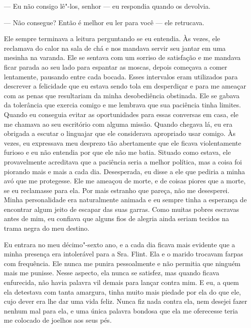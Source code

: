 --- Eu não consigo lê"-los, senhor --- eu respondia quando os devolvia.

--- Não consegue? Então é melhor eu ler para você --- ele retrucava.

Ele sempre terminava a leitura perguntando se eu entendia. Às vezes, ele
reclamava do calor na sala de chá e nos mandava servir seu jantar em uma
mesinha na varanda. Ele se sentava com um sorriso de satisfação e me
mandava ficar parada ao seu lado para espantar as moscas, depois
começava a comer lentamente, pausando entre cada bocada. Esses
intervalos eram utilizados para descrever a felicidade que eu estava
sendo tola em desperdiçar e para me ameaçar com as penas que resultariam
da minha desobediência obstinada. Ele se gabava da tolerância que
exercia comigo e me lembrava que sua paciência tinha limites. Quando eu
conseguia evitar as oportunidades para essas conversas em casa, ele me
chamava ao seu escritório com alguma missão. Quando chegava lá, eu era
obrigada a escutar o linguajar que ele considerava apropriado usar
comigo. Às vezes, eu expressava meu desprezo tão abertamente que ele
ficava violentamente furioso e eu não entendia por que ele não me batia.
Situado como estava, ele provavelmente acreditava que a paciência seria
a melhor política, mas a coisa foi piorando mais e mais a cada dia.
Desesperada, eu disse a ele que pediria a minha avó que me protegesse.
Ele me ameaçou de morte, e de coisas piores que a morte, se eu
reclamasse para ela. Por mais estranho que pareça, não me desesperei.
Minha personalidade era naturalmente animada e eu sempre tinha a
esperança de encontrar algum jeito de escapar das suas garras. Como
muitas pobres escravas antes de mim, eu confiava que alguns fios de
alegria ainda seriam tecidos na trama negra do meu destino.

Eu entrara no meu décimo"-sexto ano, e a
cada dia ficava mais evidente que a minha presença era intolerável para
a Sra. Flint. Ela e o marido trocavam farpas com frequência. Ele nunca
me punira pessoalmente e não permitia que ninguém mais me punisse. Nesse
aspecto, ela nunca se satisfez, mas quando ficava enfurecida, não havia
palavra vil demais para lançar contra mim. E eu, a quem ela detestava
com tanta amargura, tinha muito mais piedade por ela do que ele, cujo
dever era lhe dar uma vida feliz. Nunca fiz nada contra ela, nem desejei
fazer nenhum mal para ela, e uma única palavra bondosa que ela me
oferecesse teria me colocado de joelhos aos seus pés.

